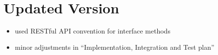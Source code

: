 \chapter{Updated Version}

\begin{itemize}
    \item used RESTful API convention for interface methods
    \item minor adjustments in “Implementation, Integration and Test plan”    
\end{itemize}